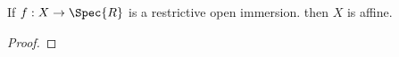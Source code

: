 \begin{lemma}
If $f:X\rightarrow \Spec{R}$ is a restrictive open immersion. 
then $X$ is affine.
\end{lemma}
\begin{proof}
\end{proof}